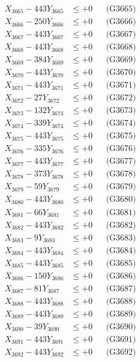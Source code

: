 \documentclass[a4paper,10pt]{article}
\begin{document}
{\begin{align}
X_{3665} - 443Y_{3665} &\leq +0 && \text{(G3665)} \\
X_{3666} - 250Y_{3666} &\leq +0 && \text{(G3666)} \\
X_{3667} - 443Y_{3667} &\leq +0 && \text{(G3667)} \\
X_{3668} - 443Y_{3668} &\leq +0 && \text{(G3668)} \\
X_{3669} - 384Y_{3669} &\leq +0 && \text{(G3669)} \\
X_{3670} - 443Y_{3670} &\leq +0 && \text{(G3670)} \\
\allowbreak
X_{3671} - 443Y_{3671} &\leq +0 && \text{(G3671)} \\
X_{3672} - 27Y_{3672} &\leq +0 && \text{(G3672)} \\
X_{3673} - 132Y_{3673} &\leq +0 && \text{(G3673)} \\
X_{3674} - 339Y_{3674} &\leq +0 && \text{(G3674)} \\
X_{3675} - 443Y_{3675} &\leq +0 && \text{(G3675)} \\
X_{3676} - 335Y_{3676} &\leq +0 && \text{(G3676)} \\
X_{3677} - 443Y_{3677} &\leq +0 && \text{(G3677)} \\
X_{3678} - 373Y_{3678} &\leq +0 && \text{(G3678)} \\
X_{3679} - 59Y_{3679} &\leq +0 && \text{(G3679)} \\
X_{3680} - 443Y_{3680} &\leq +0 && \text{(G3680)} \\
\allowbreak
X_{3681} - 66Y_{3681} &\leq +0 && \text{(G3681)} \\
X_{3682} - 443Y_{3682} &\leq +0 && \text{(G3682)} \\
X_{3683} - 9Y_{3683} &\leq +0 && \text{(G3683)} \\
X_{3684} - 443Y_{3684} &\leq +0 && \text{(G3684)} \\
X_{3685} - 443Y_{3685} &\leq +0 && \text{(G3685)} \\
X_{3686} - 150Y_{3686} &\leq +0 && \text{(G3686)} \\
X_{3687} - 81Y_{3687} &\leq +0 && \text{(G3687)} \\
X_{3688} - 443Y_{3688} &\leq +0 && \text{(G3688)} \\
X_{3689} - 443Y_{3689} &\leq +0 && \text{(G3689)} \\
X_{3690} - 39Y_{3690} &\leq +0 && \text{(G3690)} \\
\allowbreak
X_{3691} - 443Y_{3691} &\leq +0 && \text{(G3691)} \\
X_{3692} - 443Y_{3692} &\leq +0 && \text{(G3692)} \\

\end{align}}
\end{document}
